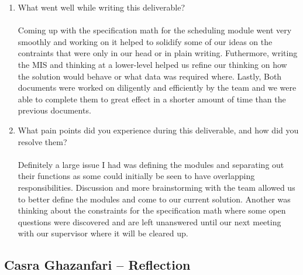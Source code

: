 \documentclass[12pt, titlepage]{article}
\begin{document}
\begin{enumerate}
  \item What went well while writing this deliverable?\\\\
  Coming up with the specification math for the scheduling module went very smoothly and working on it 
  helped to solidify some of our ideas on the contraints that were only in our head or in plain 
  writing. Futhermore, writing the MIS and thinking at a lower-level helped us refine our thinking on
  how the solution would behave or what data was required where. Lastly, Both documents were worked 
  on diligently and efficiently by the team and we were able to complete them to great effect in a 
  shorter amount of time than the previous documents.  
  \item What pain points did you experience during this deliverable, and how
  did you resolve them?\\\\
  Definitely a large issue I had was defining the modules and separating out their functions as some
  could initially be seen to have overlapping responsibilities. Discussion and more brainstorming with
  the team allowed us to better define the modules and come to our current solution. Another was thinking 
  about the constraints for the specification math where some open questions were discovered and are 
  left unanswered until our next meeting with our supervisor where it will be cleared up.  
\end{enumerate}

\subsection*{Casra Ghazanfari -- Reflection}
\end{document}
